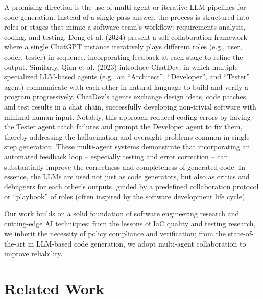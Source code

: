 \documentclass[manuscript,screen,nonacm]{acmart}
\begin{document}
A promising direction is the use of multi-agent or iterative LLM pipelines for code generation. Instead of a single-pass answer, the process is structured into roles or stages that mimic a software team’s workflow: requirements analysis, coding, and testing. Dong et al. (2024) \cite{dong2024self} present a self-collaboration framework where a single ChatGPT instance iteratively plays different roles (e.g., user, coder, tester) in sequence, incorporating feedback at each stage to refine the output. Similarly, Qian et al. (2023) \cite{qian2023chatdev} introduce ChatDev, in which multiple specialized LLM-based agents (e.g., an “Architect”, “Developer”, and “Tester” agent) communicate with each other in natural language to build and verify a program progressively. ChatDev’s agents exchange design ideas, code patches, and test results in a chat chain, successfully developing non-trivial software with minimal human input. Notably, this approach reduced coding errors by having the Tester agent catch failures and prompt the Developer agent to fix them, thereby addressing the hallucination and oversight problems common in single-step generation. These multi-agent systems demonstrate that incorporating an automated feedback loop – especially testing and error correction – can substantially improve the correctness and completeness of generated code. In essence, the LLMs are used not just as code generators, but also as critics and debuggers for each other’s outputs, guided by a predefined collaboration protocol or “playbook” of roles (often inspired by the software development life cycle).

Our work builds on a solid foundation of software engineering research and cutting-edge AI techniques: from the lessons of IaC quality and testing research, we inherit the necessity of policy compliance and verification; from the state-of-the-art in LLM-based code generation, we adopt multi-agent collaboration to improve reliability.


\section{Related Work}
\end{document}
